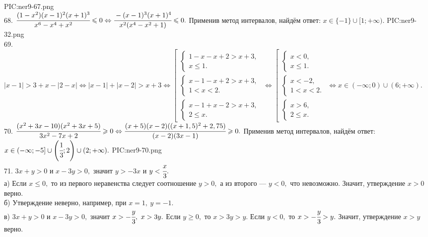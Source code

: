 {{PIC:ner9-67.png}}\\
68. $\cfrac{(1-x^2)(x-1)^2(x+1)^3}{x^6-x^4+x^2}\leqslant0\Leftrightarrow\cfrac{-(x-1)^3(x+1)^4}{x^2(x^4-x^2+1)}\leqslant0.$ Применив метод интервалов, найдём ответ: $x\in\{-1\}\cup[1;+\infty).$
{{PIC:ner9-32.png}}\\
69. $|x-1|>3+x-|2-x|\Leftrightarrow |x-1|+|x-2|>x+3\Leftrightarrow\left[\begin{array}{l} \begin{cases} 1-x-x+2>x+3,\\
x\leqslant1.\end{cases}\\ \begin{cases} x-1-x+2>x+3,\\ 1<x<2.\end{cases} \\ \begin{cases} x-1+x-2>x+3,\\ 2\leqslant x.\end{cases}\end{array}\right.\Leftrightarrow
\left[\begin{array}{l} \begin{cases} x<0,\\
x\leqslant1.\end{cases}\\ \begin{cases} x<-2,\\ 1<x<2.\end{cases} \\ \begin{cases} x>6,\\ 2\leqslant x.\end{cases}\end{array}\right.\Leftrightarrow
x\in(-\infty;0)\cup(6;+\infty).$\\
70. $\cfrac{(x^2+3x-10)(x^2+3x+5)}{3x^2-7x+2}\geqslant0\Leftrightarrow\cfrac{(x+5)(x-2)((x+1,5)^2+2,75)}{(x-2)(3x-1)}\geqslant0.$ Применив метод интервалов, найдём ответ: $x\in(-\infty;-5]\cup\left(\cfrac{1}{3};2\right)\cup(2;+\infty).$
{{PIC:ner9-70.png}}\\
71. $3x+y>0$ и $x-3y>0,$ значит $y>-3x$ и $y<\cfrac{x}{3}.$\\
а) Если $x\leqslant0,$ то  из первого неравенства следует соотношение $y>0,$ а из второго --- $y<0,$ что невозможно. Значит, утверждение $x>0$ верно.\\
б) Утверждение неверно, например, при $x=1,\ y=-1.$\\
в) $3x+y>0$ и $x-3y>0,$ значит $x>-\cfrac{y}{3},\ x>3y.$ Если $y\geqslant0,$ то $x>3y>y.$ Если $y<0,$ то $x>-\cfrac{y}{3}>y.$ Значит, утверждение $x>y$ верно.\\
